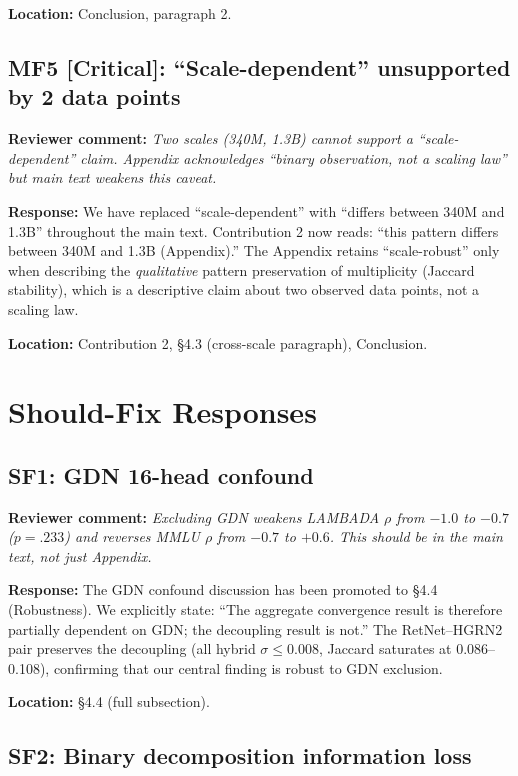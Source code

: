\documentclass[11pt]{article}
\newcommand{\reviewer}[1]{\textcolor{reviewercolor}{\textbf{Reviewer comment:} \textit{#1}}}
\newcommand{\response}[1]{\textcolor{responsecolor}{\textbf{Response:} #1}}
\newcommand{\location}[1]{\textbf{Location:} #1}
\begin{document}
\location{Conclusion, paragraph 2.}

\subsection*{MF5 [Critical]: ``Scale-dependent'' unsupported by 2 data points}

\reviewer{Two scales (340M, 1.3B) cannot support a ``scale-dependent'' claim. Appendix acknowledges ``binary observation, not a scaling law'' but main text weakens this caveat.}

\response{We have replaced ``scale-dependent'' with ``differs between 340M and 1.3B'' throughout the main text. Contribution 2 now reads: ``this pattern differs between 340M and 1.3B (Appendix).'' The Appendix retains ``scale-robust'' only when describing the \emph{qualitative} pattern preservation of multiplicity (Jaccard stability), which is a descriptive claim about two observed data points, not a scaling law.}

\location{Contribution 2, \S4.3 (cross-scale paragraph), Conclusion.}

\section*{Should-Fix Responses}

\subsection*{SF1: GDN 16-head confound}

\reviewer{Excluding GDN weakens LAMBADA $\rho$ from $-1.0$ to $-0.7$ ($p = .233$) and reverses MMLU $\rho$ from $-0.7$ to $+0.6$. This should be in the main text, not just Appendix.}

\response{The GDN confound discussion has been promoted to \S4.4 (Robustness). We explicitly state: ``The aggregate convergence result is therefore partially dependent on GDN; the decoupling result is not.'' The RetNet--HGRN2 pair preserves the decoupling (all hybrid $\sigma \leq 0.008$, Jaccard saturates at 0.086--0.108), confirming that our central finding is robust to GDN exclusion.}

\location{\S4.4 (full subsection).}

\subsection*{SF2: Binary decomposition information loss}
\end{document}
